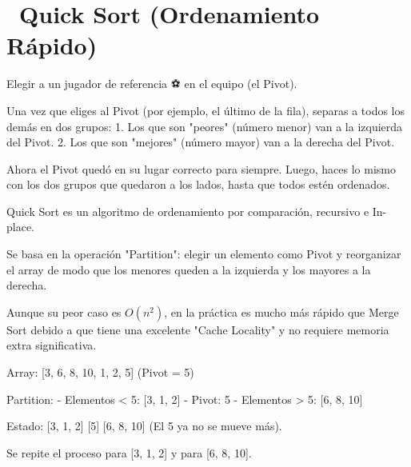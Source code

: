 ﻿\chapter[\emj{⚡}~Quick Sort (Ordenamiento Rápido)]{~Quick Sort (Ordenamiento Rápido)}

\begin{dsaquees}

Elegir a un jugador de referencia ⚽ en el equipo (el Pivot). 

Una vez que eliges al Pivot (por ejemplo, el último de la fila), 
separas a todos los demás en dos grupos:
1. Los que son "peores" (número menor) van a la izquierda del Pivot.
2. Los que son "mejores" (número mayor) van a la derecha del Pivot.

Ahora el Pivot quedó en su lugar correcto para siempre. Luego, haces
lo mismo con los dos grupos que quedaron a los lados, hasta que todos
estén ordenados.

\end{dsaquees}

\begin{dsaotraforma}

Quick Sort es un algoritmo de ordenamiento por comparación, 
recursivo e In-place. 

Se basa en la operación "Partition": elegir un elemento como Pivot y 
reorganizar el array de modo que los menores queden a la izquierda y 
los mayores a la derecha. 

Aunque su peor caso es $O(n^2)$, en la práctica es mucho más rápido que 
Merge Sort debido a que tiene una excelente "Cache Locality" y no 
requiere memoria extra significativa.

\end{dsaotraforma}

\begin{dsadiagrama}
Array: [3, 6, 8, 10, 1, 2, 5]  (Pivot = 5)

Partition:
- Elementos < 5: [3, 1, 2]
- Pivot: 5
- Elementos > 5: [6, 8, 10]

Estado: [3, 1, 2] [5] [6, 8, 10]
(El 5 ya no se mueve más).

Se repite el proceso para [3, 1, 2] y para [6, 8, 10].
\end{dsadiagrama}

